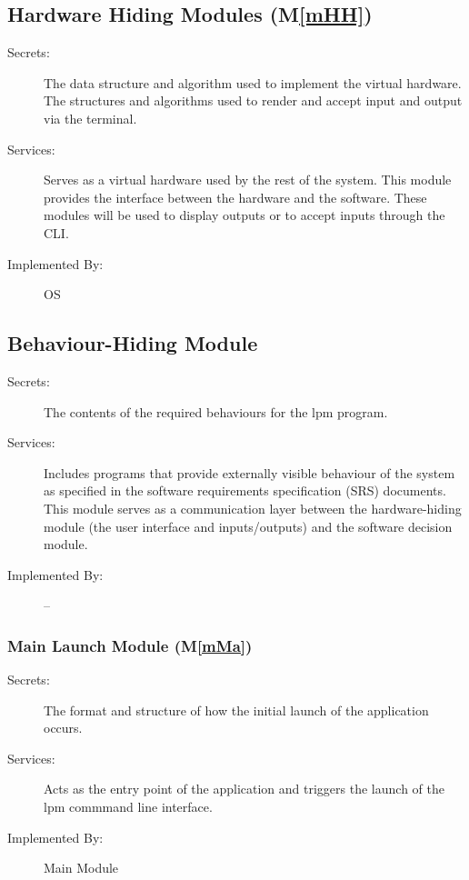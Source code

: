 \documentclass[12pt, titlepage]{article}
\newcommand{\mref}[1]{M\ref{#1}}
\begin{document}

\subsection{Hardware Hiding Modules (\mref{mHH})}

\begin{description}
\item[Secrets:] The data structure and algorithm used to implement the virtual
  hardware. The structures and algorithms used to render and accept input and output via the terminal.
\item[Services:] Serves as a virtual hardware used by the rest of the
  system. This module provides the interface between the hardware and the
  software. These modules will be used to display outputs or to accept inputs through the CLI.
\item[Implemented By:] OS
\end{description}

\subsection{Behaviour-Hiding Module}

\begin{description}
\item[Secrets:] The contents of the required behaviours for the lpm program.
\item[Services:] Includes programs that provide externally visible behaviour of
  the system as specified in the software requirements specification (SRS)
  documents. This module serves as a communication layer between the
  hardware-hiding module (the user interface and inputs/outputs) and the software decision module.
\item[Implemented By:] --
\end{description}

\subsubsection{Main Launch Module (\mref{mMa})}

\begin{description}
\item[Secrets:] The format and structure of how the initial launch of the application occurs.
\item[Services:] Acts as the entry point of the application and triggers the launch of the lpm commmand line interface.
\item[Implemented By:] Main Module
\end{description}
\end{document}
